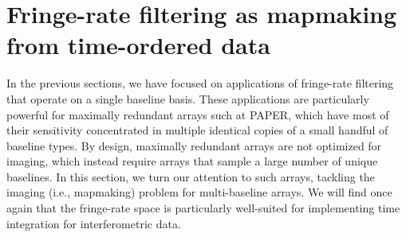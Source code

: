\documentclass[twocolumn,apj,numberedappendix]{emulateapj}
\begin{document}





\section{Fringe-rate filtering as mapmaking from time-ordered data}
\label{sec:Mapmaking}

In the previous sections, we have focused on applications of fringe-rate filtering that operate on a single baseline basis. These applications are particularly powerful for maximally redundant arrays such at PAPER, which have most of their sensitivity concentrated in multiple identical copies of a small handful of baseline types. By design, maximally redundant arrays are not optimized for imaging, which instead require arrays that sample a large number of unique baselines. In this section, we turn our attention to such arrays, tackling the imaging (i.e., mapmaking) problem for multi-baseline arrays. We will find once again that the fringe-rate space is particularly well-suited for implementing time integration for interferometric data.

\end{document}
